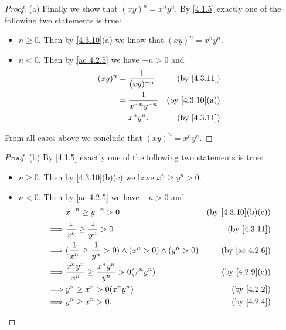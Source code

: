 \begin{proof}{(a)}
  Finally we show that \((xy)^n = x^n y^n\).
  By \cref{4.1.5} exactly one of the following two statements is true:
  \begin{itemize}
    \item \(n \geq 0\).
          Then by \cref{4.3.10}(a) we know that \((xy)^n = x^n y^n\).
    \item \(n < 0\).
          Then by \cref{ac 4.2.5} we have \(-n > 0\) and
          \begin{align*}
            (xy)^n & = \frac{1}{(xy)^{-n}}     & \text{(by \cref{4.3.11})}    \\
                   & = \frac{1}{x^{-n} y^{-n}} & \text{(by \cref{4.3.10}(a))} \\
                   & = x^n y^n.                & \text{(by \cref{4.3.11})}
          \end{align*}
  \end{itemize}
  From all cases above we conclude that \((xy)^n = x^n y^n\).
\end{proof}

\begin{proof}{(b)}
  By \cref{4.1.5} exactly one of the following two statements is true:
  \begin{itemize}
    \item \(n \geq 0\).
          Then by \cref{4.3.10}(b)(c) we have \(x^n \geq y^n > 0\).
    \item \(n < 0\).
          Then by \cref{ac 4.2.5} we have \(-n > 0\) and
          \begin{align*}
                     & x^{-n} \geq y^{-n} > 0                                                 & \text{(by \cref{4.3.10}(b)(c))} \\
            \implies & \frac{1}{x^n} \geq \frac{1}{y^n} > 0                                   & \text{(by \cref{4.3.11})}       \\
            \implies & (\frac{1}{x^n} \geq \frac{1}{y^n} > 0) \land (x^n > 0) \land (y^n > 0) & \text{(by \cref{ac 4.2.6})}     \\
            \implies & \frac{x^n y^n}{x^n} \geq \frac{x^n y^n}{y^n} > 0(x^n y^n)              & \text{(by \cref{4.2.9}(e))}     \\
            \implies & y^n \geq x^n > 0(x^n y^n)                                              & \text{(by \cref{4.2.2})}        \\
            \implies & y^n \geq x^n > 0.                                                      & \text{(by \cref{4.2.4})}
          \end{align*}
  \end{itemize}
\end{proof}

